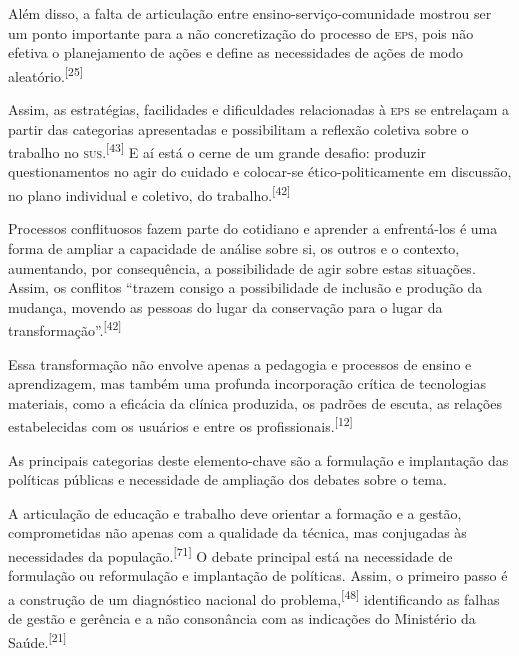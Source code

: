 \documentclass{article}
\begin{document}
Além disso, a falta de articulação entre ensino-serviço-comunidade mostrou ser
um ponto importante para a não concretização do processo de \textsc{eps}, pois não
efetiva o planejamento de ações e define as necessidades de ações de modo
aleatório.\textsuperscript{[}\textsuperscript{25}\textsuperscript{]}

Assim, as estratégias, facilidades e dificuldades relacionadas à \textsc{eps} se
entrelaçam a partir das categorias apresentadas e possibilitam a reflexão
coletiva sobre o trabalho no \textsc{sus}.\textsuperscript{[}\textsuperscript{43}\textsuperscript{]}
E aí está o cerne de um grande desafio: produzir questionamentos no agir do
cuidado e colocar-se ético-politicamente em discussão, no plano individual e
coletivo, do trabalho.\textsuperscript{[}\textsuperscript{42}\textsuperscript{]}

Processos conflituosos fazem parte do cotidiano e aprender a enfrentá-los é uma
forma de ampliar a capacidade de análise sobre si, os outros e o contexto,
aumentando, por consequência, a possibilidade de agir sobre estas situações.
Assim, os conflitos “trazem consigo a possibilidade de inclusão e produção da
mudança, movendo as pessoas do lugar da conservação para o lugar da
transformação”.\textsuperscript{[}\textsuperscript{42}\textsuperscript{]}

Essa transformação não envolve apenas a pedagogia e processos de ensino e
aprendizagem, mas também uma profunda incorporação crítica de tecnologias
materiais, como a eficácia da clínica produzida, os padrões de escuta, as
relações estabelecidas com os usuários e entre os profissionais.\textsuperscript{[}\textsuperscript{12}\textsuperscript{]}

As principais categorias deste elemento-chave são a formulação e implantação das
políticas públicas e necessidade de ampliação dos debates sobre o tema.

A articulação de educação e trabalho deve orientar a formação e a gestão,
comprometidas não apenas com a qualidade da técnica, mas conjugadas às
necessidades da população.\textsuperscript{[}\textsuperscript{71}\textsuperscript{]}
O debate principal está na necessidade de formulação ou reformulação e
implantação de políticas. Assim, o primeiro passo é a construção de um
diagnóstico nacional do problema,\textsuperscript{[}\textsuperscript{48}\textsuperscript{]}
identificando as falhas de gestão e gerência e a não consonância com as
indicações do Ministério da Saúde.\textsuperscript{[}\textsuperscript{21}\textsuperscript{]}
\end{document}

